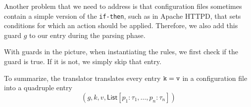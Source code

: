 Another problem that we need to address
is that configuration files sometimes contain a simple version of the {\tt {if-then}}, such as in Apache HTTPD, that 
sets conditions for which an action should be applied. Therefore, we also add this guard $g$ to our entry 
during the parsing phase. 

With guards in the picture, when instantiating the rules, we first check
 if the guard is true. If it is not, we simply skip that entry.

To summarize, the translator translates every entry ${\tt {k = v}}$ in a configuration file into a quadruple entry
$$(g,k,v,\textsf{List}[p_1:\tau_1, \ldots, p_n:\tau_n])$$

